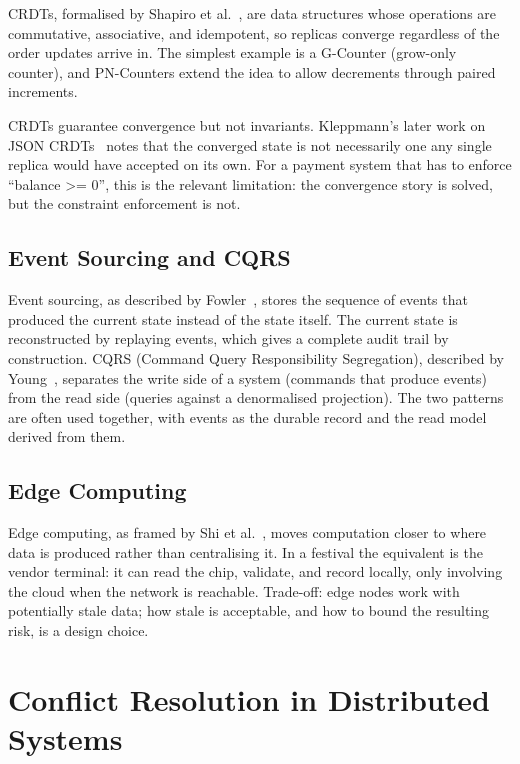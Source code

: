 CRDTs, formalised by Shapiro et al.~\cite{Shapiro2011}, are data structures whose operations are commutative, associative, and idempotent, so replicas converge regardless of the order updates arrive in. The simplest example is a G-Counter (grow-only counter), and PN-Counters extend the idea to allow decrements through paired increments.

CRDTs guarantee convergence but not invariants. Kleppmann's later work on JSON CRDTs~\cite{Kleppmann2017json} notes that the converged state is not necessarily one any single replica would have accepted on its own. For a payment system that has to enforce ``balance >= 0'', this is the relevant limitation: the convergence story is solved, but the constraint enforcement is not.

\subsection{Event Sourcing and CQRS}
\label{subsec:event-sourcing}

Event sourcing, as described by Fowler~\cite{Fowler2005}, stores the sequence of events that produced the current state instead of the state itself. The current state is reconstructed by replaying events, which gives a complete audit trail by construction. CQRS (Command Query Responsibility Segregation), described by Young~\cite{Young2010}, separates the write side of a system (commands that produce events) from the read side (queries against a denormalised projection). The two patterns are often used together, with events as the durable record and the read model derived from them.

\subsection{Edge Computing}
\label{subsec:edge-computing}

Edge computing, as framed by Shi et al.~\cite{Shi2016}, moves computation closer to where data is produced rather than centralising it. In a festival the equivalent is the vendor terminal: it can read the chip, validate, and record locally, only involving the cloud when the network is reachable. Trade-off: edge nodes work with potentially stale data; how stale is acceptable, and how to bound the resulting risk, is a design choice.

\section{Conflict Resolution in Distributed Systems}
\label{sec:conflict-resolution}

